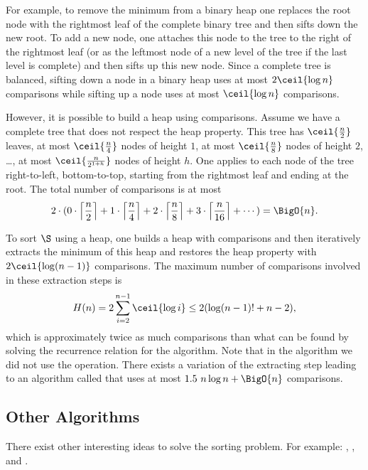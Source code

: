 For example, to remove the minimum from a binary heap one replaces the root
node with the rightmost leaf of the complete binary tree and then sifts down
the new root. To add a new node, one attaches this node to the tree to the
right of the rightmost leaf (or as the leftmost node of a new level
of the tree if the last level is complete) and then sifts up this new node.
Since a complete tree is balanced, sifting down a node in a binary heap uses
at most \(2 \ceil{\log n}\) comparisons while sifting up a node uses at most
\(\ceil{\log n}\)
comparisons.

However, it is possible to build a heap using 
comparisons. Assume we have a complete tree that does not respect the heap
property. This tree has \(\ceil{\frac{n}{2}}\) leaves, at most
\(\ceil{\frac{n}{4}}\) nodes of height \(1\), at most \(\ceil{\frac{n}{8}}\)
nodes of height \(2\), \dots, \ie at most \(\ceil{\frac{n}{2^{1+h}}}\) nodes
of height \(h\).
One applies \siftdown to each node of the tree right-to-left,
bottom-to-top, starting from the rightmost leaf and ending at the root. The
total number of comparisons is at most
\begin{displaymath}
2 \cdot ( 0 \cdot \left\lceil\frac{n}{2}\right\rceil + 1 \cdot
\left\lceil\frac{n}{4}\right\rceil + 2 \cdot
\left\lceil\frac{n}{8}\right\rceil + 3 \cdot \left\lceil\frac{n}{16}\right\rceil + \cdots ) = \BigO{n}.
\end{displaymath}

To sort \(\S\) using a heap, one builds a heap with  comparisons and
then iteratively extracts the minimum of this heap and restores the heap
property with \(2\ceil{\log (n-1)}\) comparisons. The maximum number of
comparisons involved in these extraction steps is
\begin{displaymath}
H(n) = 2 \sum_{i=2}^{n-1} \ceil{\log i} \le 2 ( \log (n-1)! + n - 2 ),
\end{displaymath}
which is approximately twice as much comparisons than what can be found by
solving the recurrence relation for the \mergesort algorithm.
Note that in the \heapsort algorithm we did not use the
\siftup operation. There exists \cite{wegener:1993} a variation of the
extracting step leading to an algorithm called \bottomupheapsort that uses at
most \(1.5~n \log n + \BigO{n}\) comparisons.

\subsection{Other Algorithms}
There exist other interesting ideas to solve the sorting problem. For
example: \shellsort \cite{shell:1959}, \smoothsort \cite{dijkstra:1982},
\introsort \cite{musser:1997} and \timsort \cite{martelli:2006}.


